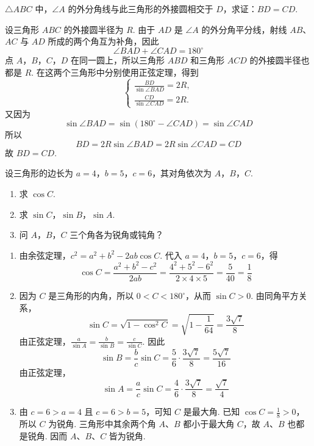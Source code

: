 \documentclass[UTF8,a4paper,oneside,11pt]{ctexbook}
\begin{document}
\begin{problem}
\(\triangle ABC\) 中，\(\angle A\) 的外分角线与此三角形的外接圆相交于 \(D\)，求证：\(BD = CD\).
\end{problem}

\begin{solution}
设三角形 \(ABC\) 的外接圆半径为 \(R\). 由于 \(AD\) 是 \(\angle A\) 的外分角平分线，射线 \(AB\)、\(AC\) 与 \(AD\) 所成的两个角互为补角，因此
\[
\angle BAD+\angle CAD=180^{\circ}
\]
点 \(A\)，\(B\)，\(C\)，\(D\) 在同一圆上，所以三角形 \(ABD\) 和三角形 \(ACD\) 的外接圆半径也都是 \(R\). 在这两个三角形中分别使用正弦定理，得到
\[
\begin{cases}
\frac{BD}{\sin\angle BAD}=2R,\\
\frac{CD}{\sin\angle CAD}=2R.
\end{cases}
\]
又因为
\[
\sin\angle BAD=\sin\left(180^{\circ}-\angle CAD\right)=\sin\angle CAD
\]
所以
\[
BD=2R\sin\angle BAD=2R\sin\angle CAD=CD
\]
故 \(BD=CD\).
\end{solution}

\begin{problem}
设三角形的边长为 \(a = 4\)，\(b = 5\)，\(c = 6\)，其对角依次为 \(A\)，\(B\)，\(C\).

\begin{enumerate}
    \item 求 \(\cos C\).
    \item 求 \(\sin C\)，\(\sin B\)，\(\sin A\).
    \item 问 \(A\)，\(B\)，\(C\) 三个角各为锐角或钝角？
\end{enumerate}
\end{problem}

\begin{solution}
\begin{enumerate}
    \item 由余弦定理，\(c^{2}=a^{2}+b^{2}-2ab\cos C\). 代入 \(a=4\)，\(b=5\)，\(c=6\)，得
    \[
    \cos C=\frac{a^{2}+b^{2}-c^{2}}{2ab}
    =\frac{4^{2}+5^{2}-6^{2}}{2\times4\times5}
    =\frac{5}{40}=\frac{1}{8}
    \]

    \item 因为 \(C\) 是三角形的内角，所以 \(0<C<180^{\circ}\)，从而 \(\sin C>0\). 由同角平方关系，
    \[
    \sin C=\sqrt{1-\cos^{2}C}
    =\sqrt{1-\frac{1}{64}}
    =\frac{3\sqrt{7}}{8}
    \]
    由正弦定理，\(\frac{a}{\sin A}=\frac{b}{\sin B}=\frac{c}{\sin C}\). 因此
    \[
    \sin B=\frac{b}{c}\sin C=\frac{5}{6}\cdot\frac{3\sqrt{7}}{8}=\frac{5\sqrt{7}}{16}
    \]
    由正弦定理，
    \[
    \sin A=\frac{a}{c}\sin C=\frac{4}{6}\cdot\frac{3\sqrt{7}}{8}=\frac{\sqrt{7}}{4}
    \]

    \item 由 \(c=6>a=4\) 且 \(c=6>b=5\)，可知 \(C\) 是最大角. 已知 \(\cos C=\frac18>0\)，所以 \(C\) 为锐角. 三角形中其余两个角 \(A\)、\(B\) 都小于最大角 \(C\)，故 \(A\)、\(B\) 也都是锐角. 因而 \(A\)、\(B\)、\(C\) 皆为锐角.
\end{enumerate}
\end{solution}
\end{document}
